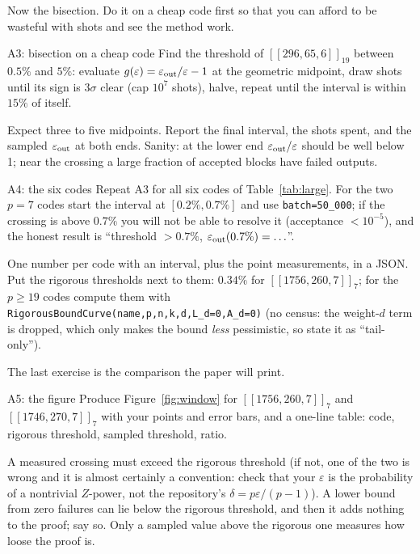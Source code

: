 \documentclass[11pt]{article}
\newcommand{\eps}{\varepsilon}
\newcommand{\code}[1]{\texttt{#1}}
\begin{document}
Now the bisection. Do it on a cheap code first so that you can afford to be wasteful
with shots and see the method work.

\begin{exercise}{A3: bisection on a cheap code}
Find the threshold of $[[296,65,6]]_{19}$ between $0.5\%$ and $5\%$: evaluate
$g(\eps)=\eps_{\rm out}/\eps-1$ at the geometric midpoint, draw shots until its sign
is $3\sigma$ clear (cap $10^7$ shots), halve, repeat until the interval is within
$15\%$ of itself.
\end{exercise}
\begin{checkbox}
Expect three to five midpoints. Report the final interval, the shots spent, and the
sampled $\eps_{\rm out}$ at both ends. Sanity: at the lower end
$\eps_{\rm out}/\eps$ should be well below 1; near the crossing a large fraction of
accepted blocks have failed outputs.
\end{checkbox}

\begin{exercise}{A4: the six codes}
Repeat A3 for all six codes of Table~\ref{tab:large}. For the two $p=7$ codes start
the interval at $[0.2\%, 0.7\%]$ and use \code{batch=50\_000}; if the crossing is
above $0.7\%$ you will not be able to resolve it (acceptance $<10^{-5}$), and the
honest result is ``threshold $>0.7\%$, $\eps_{\rm out}(0.7\%) = \ldots$''.
\end{exercise}
\begin{checkbox}
One number per code with an interval, plus the point measurements, in a JSON. Put
the rigorous thresholds next to them: $0.34\%$ for $[[1756,260,7]]_7$; for the
$p\ge19$ codes compute them with \code{RigorousBoundCurve(name,p,n,k,d,L\_d=0,A\_d=0)}
(no census: the weight-$d$ term is dropped, which only makes the bound \emph{less}
pessimistic, so state it as ``tail-only'').
\end{checkbox}

The last exercise is the comparison the paper will print.

\begin{exercise}{A5: the figure}
Produce Figure~\ref{fig:window} for $[[1756,260,7]]_7$ and $[[1746,270,7]]_7$ with
your points and error bars, and a one-line table: code, rigorous threshold, sampled
threshold, ratio.
\end{exercise}
\begin{checkbox}
A measured crossing must exceed the rigorous threshold (if not, one of the two is wrong
and it is almost certainly a convention: check that your $\eps$ is the probability of
a nontrivial $Z$-power, not the repository's $\delta = p\eps/(p-1)$). A lower bound from zero
failures can lie below the rigorous threshold, and then it adds nothing to the proof; say so. Only a
sampled value above the rigorous one measures how loose the proof is.
\end{checkbox}
\end{document}
